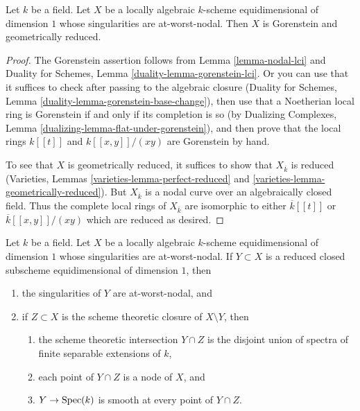 \begin{lemma}
\label{lemma-facts-about-nodal-curves}
Let $k$ be a field. Let $X$ be a locally algebraic $k$-scheme
equidimensional of dimension $1$ whose singularities are at-worst-nodal.
Then $X$ is Gorenstein and geometrically reduced.
\end{lemma}

\begin{proof}
The Gorenstein assertion follows from Lemma \ref{lemma-nodal-lci}
and Duality for Schemes, Lemma \ref{duality-lemma-gorenstein-lci}.
Or you can use that it suffices to check after passing to the
algebraic closure (Duality for Schemes, Lemma
\ref{duality-lemma-gorenstein-base-change}), then use that
a Noetherian local ring is Gorenstein if and only if its
completion is so (by Dualizing Complexes, Lemma
\ref{dualizing-lemma-flat-under-gorenstein}), and
then prove that the local rings $k[[t]]$ and $k[[x, y]]/(xy)$
are Gorenstein by hand.

\medskip\noindent
To see that $X$ is geometrically reduced, it suffices to show that
$X_{\overline{k}}$ is reduced (Varieties, Lemmas
\ref{varieties-lemma-perfect-reduced} and
\ref{varieties-lemma-geometrically-reduced}).
But $X_{\overline{k}}$ is a nodal curve over an
algebraically closed field. Thus the complete local rings
of $X_{\overline{k}}$ are isomorphic to either
$\overline{k}[[t]]$ or $\overline{k}[[x, y]]/(xy)$
which are reduced as desired.
\end{proof}

\begin{lemma}
\label{lemma-closed-subscheme-nodal-curve}
Let $k$ be a field. Let $X$ be a locally algebraic $k$-scheme
equidimensional of dimension $1$ whose singularities are at-worst-nodal.
If $Y \subset X$ is a reduced closed subscheme
equidimensional of dimension $1$, then
\begin{enumerate}
\item the singularities of $Y$ are at-worst-nodal, and
\item if $Z \subset X$ is the scheme theoretic closure of
$X \setminus Y$, then
\begin{enumerate}
\item the scheme theoretic intersection $Y \cap Z$ is
the disjoint union of spectra of finite separable extensions of $k$,
\item each point of $Y \cap Z$ is a node of $X$, and
\item $Y \to \mathop{\mathrm{Spec}}(k)$ is smooth at every point of $Y \cap Z$.
\end{enumerate}
\end{enumerate}
\end{lemma}


